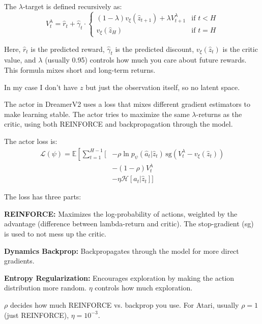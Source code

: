 \documentclass[
	english,
	ruledheaders=section,
	class=report,
	thesis={type=master},
	accentcolor=9c,
	custommargins=true,
	marginpar=false,
	parskip=half-,
	fontsize=11pt,
]{tudapub}
\begin{document}
The $\lambda$-target is defined recursively as:
\begin{equation}
	V^{\lambda}_t = \hat{r}_t + \hat{\gamma}_t \cdot \begin{cases}
		(1 - \lambda)v_\xi(\hat{z}_{t+1}) + \lambda V^{\lambda}_{t+1} & \text{if } t < H \\
		v_\xi(\hat{z}_H)                                              & \text{if } t = H
	\end{cases}
\end{equation}

Here, $\hat{r}_t$ is the predicted reward, $\hat{\gamma}_t$ is the predicted
discount, $v_\xi(\hat{z}_t)$ is the critic value, and $\lambda$ (usually 0.95)
controls how much you care about future rewards. This formula mixes short and
long-term returns.

In my case I don't have $z$ but just the observation itself, so no latent
space.

The actor in DreamerV2 uses a loss that mixes different gradient estimators to
make learning stable. The actor tries to maximize the same $\lambda$-returns as
the critic, using both REINFORCE and backpropagation through the model.

The actor loss is:
\begin{align}
	\mathcal{L}(\psi) = \mathbb{E}\left[\sum_{t=1}^{H-1} \Big[\right. & -\rho \ln p_\psi(\hat{a}_t | \hat{z}_t) \, \text{sg}(V^{\lambda}_t - v_\xi(\hat{z}_t)) \\
	                                                                  & -(1-\rho)V^{\lambda}_t                                                                 \\
	                                                                  & -\eta \mathcal{H}[a_t|\hat{z}_t] \Big]
\end{align}

The loss has three parts:

\textbf{REINFORCE:} Maximizes the log-probability of actions, weighted by the advantage (difference between lambda-return and critic). The stop-gradient (sg) is used to not mess up the critic.

\textbf{Dynamics Backprop:} Backpropagates through the model for more direct gradients.

\textbf{Entropy Regularization:} Encourages exploration by making the action distribution more random. $\eta$ controls how much exploration.

$\rho$ decides how much REINFORCE vs. backprop you use. For Atari, usually $\rho=1$ (just REINFORCE), $\eta=10^{-3}$.
\end{document}
